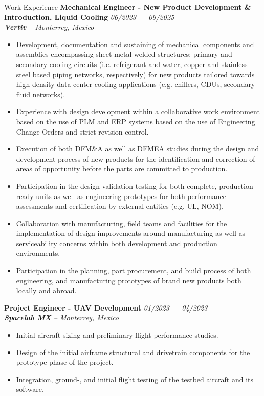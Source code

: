 \documentclass[a4paper]{resume} %
\begin{document}
\begin{rSection}{Work Experience}
        {\bf Mechanical Engineer - New Product Development \& Introduction, Liquid Cooling} \hfill{\itshape 06/2023 --- 09/2025} 
        \\{\textit{\textbf{Vertiv} -- Monterrey, Mexico}}
        \begin{itemize}
            \item Development, documentation and sustaining of mechanical components and assemblies encompassing sheet metal welded structures; primary and secondary cooling circuits (i.e. refrigerant and water, copper and stainless steel based piping networks, respectively) for new products tailored towards high density data center cooling applications (e.g. chillers, CDUs, secondary fluid networks). 
            \item Experience with design development within a collaborative work environment based on the use of PLM and ERP systems based on the use of Engineering Change Orders and strict revision control.
            \item Execution of both DFM\&A as well as DFMEA studies during the design and development process of new products for the identification and correction of areas of opportunity before the parts are committed to production.
            \item Participation in the design validation testing for both complete, production-ready units as well as engineering prototypes for both performance assessments and certification by external entities (e.g. UL, NOM).
            \item Collaboration with manufacturing, field teams and facilities for the implementation of design improvements around manufacturing as well as serviceability concerns within both development and production environments.
            \item Participation in the planning, part procurement, and build process of both engineering, and manufacturing prototypes of brand new products both locally and abroad.
        \end{itemize}
        
        {\bf Project Engineer - UAV Development} \hfill{\itshape 01/2023 --- 04/2023} 
        \\{\textit{\textbf{Spacelab MX} -- Monterrey, Mexico}}
        \begin{itemize}
            \item Initial aircraft sizing and preliminary flight performance studies.
            \item Design of the initial airframe structural and drivetrain components for the prototype phase of the project.
            \item Integration, ground-, and initial flight testing of the testbed aircraft and its software.
        \end{itemize}
    

\end{rSection}
\end{document}
